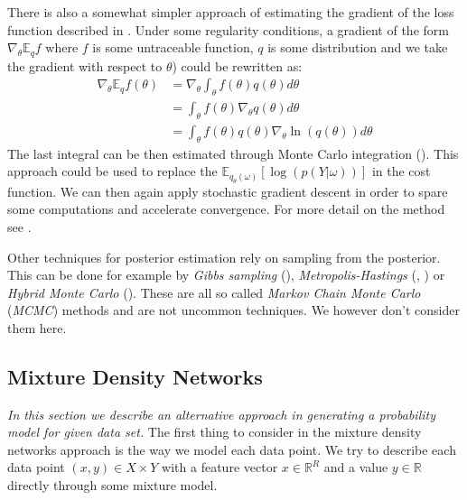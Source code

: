 \documentclass[12pt,a4paper,twoside]{scrartcl}
\numberwithin{equation}{section}
\begin{document}
There is also a somewhat simpler approach of estimating the gradient of the loss function described in \cite{paisley2012}. Under some regularity conditions, a gradient of the form \(\nabla_{\theta}\mathbb{E}_qf \) where \(f \) is some untraceable function, \(q\) is some distribution and we take the gradient with respect to \(\theta\))  could be rewritten as:
\begin{align}
  \nabla_{\theta}\mathbb{E}_qf(\theta) &= \nabla_{\theta}\int_{\theta} f(\theta)q(\theta)d\theta \\
                                       &= \int_{\theta} f(\theta) \nabla_{\theta}q(\theta)d\theta \\
                                       &= \int_{\theta} f(\theta)q(\theta) \nabla_{\theta}\ln(q(\theta)) d\theta
\end{align}
The last integral can be then estimated through Monte Carlo integration (\cite{hammersley1964}). This approach could be used to replace the \(\mathbb{E}_{q_{\theta}(\omega)}[\log(p(Y|\omega))]\) in the cost function. We can then again apply stochastic gradient descent in order to spare some computations and  accelerate convergence. For more detail on the method see \cite{paisley2012}.

Other techniques for posterior estimation rely on sampling from the posterior. This can be done for example by \emph{Gibbs sampling} (\cite{geman1984}), \emph{Metropolis-Hastings} (\cite{metropolis1953}, \cite{hastings1970}) or \emph{Hybrid Monte Carlo} (\cite{duane1987}). These are all so called \emph{Markov Chain Monte Carlo} (\emph{MCMC}) methods and are not uncommon techniques. We however don't consider them here.

\subsection{Mixture Density Networks}
\label{sec:mdn}

\emph{In this section we describe an alternative approach in generating a probability model for given data set.} The first thing to consider in the  mixture density networks approach is the way we model each data point. We try to describe each data point \((x,y)\in X\times Y\) with a feature vector \(x\in\mathbb{R}^R\) and a value \(y\in\mathbb{R}\) directly through some mixture model.
 
\end{document}
